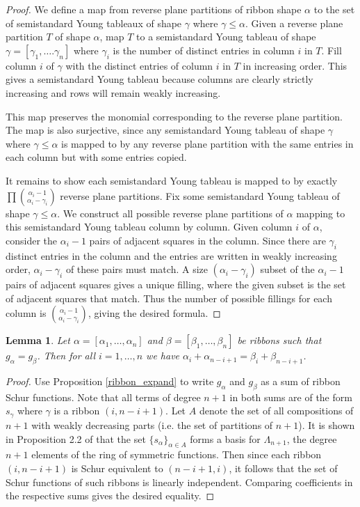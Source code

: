\documentclass[12pt]{amsart}
\newtheorem{lem}[thm]{Lemma}
\theoremstyle{definition}
\begin{document}
\begin{proof}
We define a map from reverse plane partitions of ribbon shape $\alpha$ to the set of semistandard Young tableaux of shape $\gamma$ where $\gamma \leq \alpha$. Given a reverse plane partition $T$ of shape $\alpha$, map $T$ to a semistandard Young tableau of shape $\gamma = [\gamma_1,\ldots.\gamma_n]$ where $\gamma_i$ is the number of distinct entries in column $i$ in $T$. Fill column $i$ of $\gamma$ with the distinct entries of column $i$ in $T$ in increasing order. This gives a semistandard Young tableau because columns are clearly strictly increasing and rows will remain weakly increasing. 

This map preserves the monomial corresponding to the reverse plane partition. The map is also surjective, since any semistandard Young tableau of shape $\gamma$ where $\gamma \leq \alpha$ is mapped to by any reverse plane partition with the same entries in each column but with some entries copied.

It remains to show each semistandard Young tableau is mapped to by exactly $\prod \binom{\alpha_i-1}{\alpha_i-\gamma_i}$ reverse plane partitions. Fix some semistandard Young tableau of shape $\gamma \leq \alpha$. We construct all possible reverse plane partitions of $\alpha$ mapping to this semistandard Young tableau column by column. Given column $i$ of $\alpha$, consider the $\alpha_i-1$ pairs of adjacent squares in the column. Since there are $\gamma_i$ distinct entries in the column and the entries are written in weakly increasing order, $\alpha_i - \gamma_i$ of these pairs must match. A size $(\alpha_i-\gamma_i)$ subset of the $\alpha_i-1$ pairs of adjacent squares gives a unique filling, where the given subset is the set of adjacent squares that match. Thus the number of possible fillings for each column is $\binom{\alpha_i-1}{\alpha_i-\gamma_i}$, giving the desired formula. 
\end{proof}

\begin{lem}
\label{ribbon-col-sum}
Let $\alpha = [\alpha_1, \ldots, \alpha_n]$ and $\beta = [\beta_1, \ldots, \beta_n]$ be ribbons such that $g_\alpha = g_\beta$. Then for all $i=1,\ldots,n$ we have $\alpha_i + \alpha_{n-i+1} = \beta_i + \beta_{n-i+1}$.
\end{lem}
\begin{proof}
Use Proposition \ref{ribbon_expand} to write $g_\alpha$ and $g_\beta$ as a sum of ribbon Schur functions. Note that all terms of degree $n+1$ in both sums are of the form $s_\gamma$ where $\gamma$ is a ribbon $(i,n-i+1)$. Let $A$ denote the set of all compositions of $n+1$ with weakly decreasing parts (i.e. the set of partitions of $n+1$). It is shown in Proposition 2.2 of \cite{billera2006decomposable} that the set $\lbrace{s_\alpha}\rbrace_{\alpha\in A}$ forms a basis for $\Lambda_{n+1}$, the degree $n+1$ elements of the ring of symmetric functions. Then since each ribbon $(i,n-i+1)$ is Schur equivalent to $(n-i+1,i)$, it follows that the set of Schur functions of such ribbons is linearly independent. Comparing coefficients in the respective sums gives the desired equality.
\end{proof}
\end{document}
